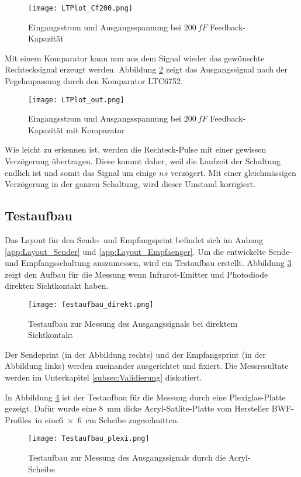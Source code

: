 \begin{figure}[H]
	\centering
	\texttt{[image: LTPlot\_Cf200.png]}
	\caption{Eingangsstrom und Ausgangsspannung bei $\SI{200}{fF}$ Feedback-Kapazität}\label{fig:Plot_Cf200}
\end{figure}

Mit einem Komparator kann nun aus dem Signal wieder das gewünschte Rechtecksignal erzeugt werden. Abbildung \ref{fig:Plot_out} zeigt das Ausgangssignal nach der Pegelanpassung durch den Komparator LTC6752.

\begin{figure}[H]
	\centering
	\texttt{[image: LTPlot\_out.png]}
	\caption{Eingangsstrom und Ausgangsspannung bei $\SI{200}{fF}$ Feedback-Kapazität mit Komparator}\label{fig:Plot_out}
\end{figure}
Wie leicht zu erkennen ist, werden die Rechteck-Pulse mit einer gewissen Verzögerung übertragen. Diese kommt daher, weil die Laufzeit der Schaltung endlich ist und somit das Signal um einige $ns$ verzögert.
Mit einer gleichmässigen Verzögerung in der ganzen Schaltung, wird dieser Umstand korrigiert.
\newpage
\subsection{Testaufbau}
\label{subsec:Testaufbau}
Das Layout für den Sende- und Empfangsprint befindet sich im Anhang \ref{app:Layout_Sender} und \ref{app:Layout_Empfaenger}. Um die entwickelte Sende- und Empfangsschaltung auszumessen, wird ein Testaufbau erstellt. Abbildung \ref{fig:Test_direkt} zeigt den Aufbau für die Messung wenn Infrarot-Emitter und Photodiode direkten Sichtkontakt haben.
\begin{figure}[H]
	\centering
	\texttt{[image: Testaufbau\_direkt.png]}
	\caption{Testaufbau zur Messung des Ausgangssignals bei direktem Sichtkontakt}\label{fig:Test_direkt}
\end{figure}
Der Sendeprint (in der Abbildung rechts) und der Empfangsprint (in der Abbildung links) werden zueinander ausgerichtet und fixiert. Die Messresultate werden im Unterkapitel \ref{subsec:Validierung} diskutiert.

In Abbildung \ref{fig:Test_plexi} ist der Testaufbau für die Messung durch eine Plexiglas-Platte gezeigt. Dafür wurde eine \SI{8}{mm} dicke Acryl-Satlite-Platte vom Hersteller \glqq BWF-Profiles\grqq\  in eine\linebreak \SI{6x6}{cm} Scheibe zugeschnitten.
\begin{figure}[H]
	\centering
	\texttt{[image: Testaufbau\_plexi.png]}
	\caption{Testaufbau zur Messung des Ausgangssignals durch die Acryl-Scheibe}\label{fig:Test_plexi}
\end{figure}

